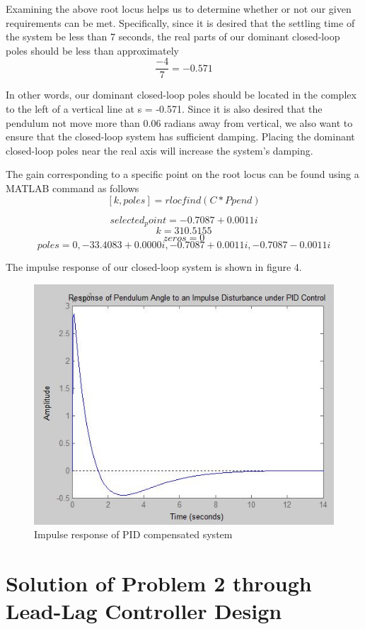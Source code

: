 \documentclass{article}
\begin{document}
Examining the above root locus helps us to determine whether or not our given requirements can be met. Specifically, since it is desired that the settling time of the system be less than 7 seconds, the real parts of our dominant closed-loop poles should be less than approximately 
\[\frac{-4}{7} = -0.571\]

In other words, our dominant closed-loop poles should be located in the complex to the left of a vertical line at s = -0.571. Since it is also desired that the pendulum not move more than 0.06 radians away from vertical, we also want to ensure that the closed-loop system has sufficient damping. Placing the dominant closed-loop poles near the real axis will increase the system's damping.

The  gain corresponding to a specific point on the root locus can be found using a MATLAB command as follows
\[[k,poles] = rlocfind(C*Ppend)\]

\[selected_point = -0.7087 + 0.0011i\]
\[k =310.5155\]
\[zeros = 0\]
\[poles =0,-33.4083 + 0.0000i, -0.7087 + 0.0011i, -0.7087 - 0.0011i\]


The impulse response of our closed-loop system is shown in figure 4.

\begin{figure}[h]
  \includegraphics[width=\linewidth]{fig4.JPG}
  \caption{Impulse response of PID compensated system}
  \label{fig:boat1}
\end{figure}



\section{Solution of Problem 2 through Lead-Lag Controller Design}
\end{document}

